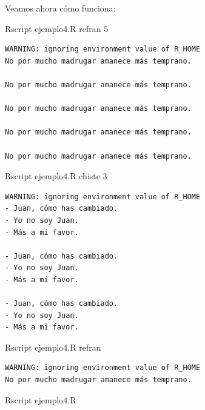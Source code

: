 \documentclass[
]{book}
\newenvironment{Shaded}{\begin{snugshade}}{\end{snugshade}}
\newcommand{\ExtensionTok}[1]{#1}
\newcommand{\NormalTok}[1]{#1}
\begin{document}
Veamos ahora cómo funciona:

\begin{Shaded}
\begin{Highlighting}[]
\ExtensionTok{Rscript}\NormalTok{ ejemplo4.R refran 5}
\end{Highlighting}
\end{Shaded}

\begin{verbatim}
WARNING: ignoring environment value of R_HOME
No por mucho madrugar amanece más temprano.

No por mucho madrugar amanece más temprano.

No por mucho madrugar amanece más temprano.

No por mucho madrugar amanece más temprano.

No por mucho madrugar amanece más temprano.
\end{verbatim}

\begin{Shaded}
\begin{Highlighting}[]
\ExtensionTok{Rscript}\NormalTok{ ejemplo4.R chiste 3}
\end{Highlighting}
\end{Shaded}

\begin{verbatim}
WARNING: ignoring environment value of R_HOME
- Juan, cómo has cambiado.
- Yo no soy Juan.
- Más a mi favor.

- Juan, cómo has cambiado.
- Yo no soy Juan.
- Más a mi favor.

- Juan, cómo has cambiado.
- Yo no soy Juan.
- Más a mi favor.
\end{verbatim}

\begin{Shaded}
\begin{Highlighting}[]
\ExtensionTok{Rscript}\NormalTok{ ejemplo4.R refran}
\end{Highlighting}
\end{Shaded}

\begin{verbatim}
WARNING: ignoring environment value of R_HOME
No por mucho madrugar amanece más temprano.
\end{verbatim}

\begin{Shaded}
\begin{Highlighting}[]
\ExtensionTok{Rscript}\NormalTok{ ejemplo4.R}
\end{Highlighting}
\end{Shaded}
\end{document}
